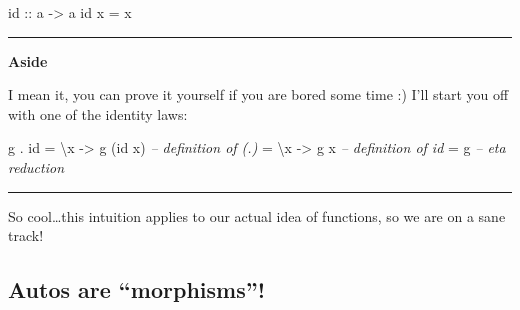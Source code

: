 \documentclass[]{article}
\newenvironment{Shaded}{}{}
\newcommand{\CommentTok}[1]{\textcolor[rgb]{0.38,0.63,0.69}{\textit{#1}}}
\newcommand{\DecValTok}[1]{\textcolor[rgb]{0.25,0.63,0.44}{#1}}
\newcommand{\FunctionTok}[1]{\textcolor[rgb]{0.02,0.16,0.49}{#1}}
\newcommand{\NormalTok}[1]{#1}
\newcommand{\OtherTok}[1]{\textcolor[rgb]{0.00,0.44,0.13}{#1}}
\begin{document}
\begin{Shaded}
\begin{Highlighting}[]
\NormalTok{id}\OtherTok{ ::}\NormalTok{ a }\OtherTok{->}\NormalTok{ a}
\NormalTok{id x }\FunctionTok{=}\NormalTok{ x}
\end{Highlighting}
\end{Shaded}

\begin{Shaded}
\end{Shaded}

\begin{center}\rule{0.5\linewidth}{\linethickness}\end{center}

\textbf{Aside}

I mean it, you can prove it yourself if you are bored some time :) I'll start
you off with one of the identity laws:

\begin{Shaded}
\begin{Highlighting}[]
\NormalTok{g }\FunctionTok{.}\NormalTok{ id }\FunctionTok{=}\NormalTok{ \textbackslash{}x }\OtherTok{->}\NormalTok{ g (id x)     }\CommentTok{-- definition of (.)}
       \FunctionTok{=}\NormalTok{ \textbackslash{}x }\OtherTok{->}\NormalTok{ g x          }\CommentTok{-- definition of id}
       \FunctionTok{=}\NormalTok{ g                  }\CommentTok{-- eta reduction}
\end{Highlighting}
\end{Shaded}

\begin{center}\rule{0.5\linewidth}{\linethickness}\end{center}

So cool\ldots{}this intuition applies to our actual idea of functions, so we are
on a sane track!

\hypertarget{autos-are-morphisms}{%
\subsection{Autos are ``morphisms''!}\label{autos-are-morphisms}}
\end{document}
